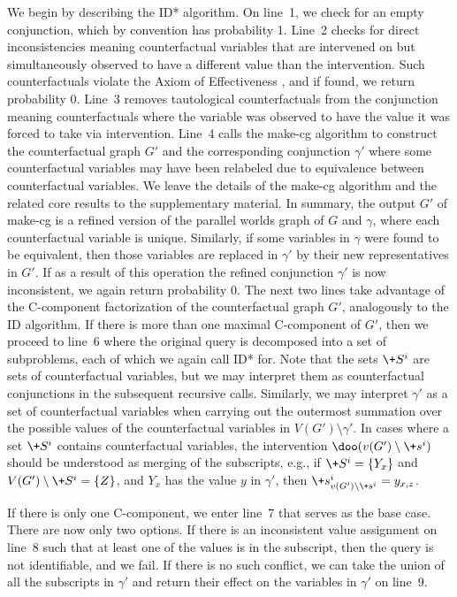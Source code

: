 We begin by describing the ID* algorithm. On line~1, we check for an empty conjunction, which by convention has probability 1. Line~2 checks for direct inconsistencies meaning counterfactual variables that are intervened on but simultaneously observed to have a different value than the intervention. Such counterfactuals violate the Axiom of Effectiveness \citep{pearl2009}, and if found, we return probability 0. Line~3 removes tautological counterfactuals from the conjunction meaning counterfactuals where the variable was observed to have the value it was forced to take via intervention. Line~4 calls the make-cg algorithm to construct the counterfactual graph \(G'\) and the corresponding conjunction \(\gamma'\) where some counterfactual variables may have been relabeled due to equivalence between counterfactual variables. We leave the details of the make-cg algorithm and the related core results to the supplementary material. In summary, the output \(G'\) of make-cg is a refined version of the parallel worlds graph of \(G\) and \(\gamma\), where each counterfactual variable is unique. Similarly, if some variables in \(\gamma\) were found to be equivalent, then those variables are replaced in \(\gamma'\) by their new representatives in \(G'\). If as a result of this operation the refined conjunction \(\gamma'\) is now inconsistent, we again return probability 0. The next two lines take advantage of the C-component factorization of the counterfactual graph \(G'\), analogously to the ID algorithm. If there is more than one maximal C-component of \(G'\), then we proceed to line~6 where the original query is decomposed into a set of subproblems, each of which we again call ID* for. Note that the sets \(\+ S^i\) are sets of counterfactual variables, but we may interpret them as counterfactual conjunctions in the subsequent recursive calls. Similarly, we may interpret \(\gamma'\) as a set of counterfactual variables when carrying out the outermost summation over the possible values of the counterfactual variables in \(V(G')\setminus \gamma'\). In cases where a set \(\+ S^i\) contains counterfactual variables, the intervention \(\doo(v(G') \setminus \+ s^i)\) should be understood as merging of the subscripts, e.g., if \(\+ S^i = \{Y_x\}\) and \(V(G') \setminus \+ S^i = \{Z\}\), and \(Y_x\) has the value \(y\) in \(\gamma'\), then \(\+ s^i_{v(G')\setminus \+ s^i} = y_{x,z}\).

If there is only one C-component, we enter line~7 that serves as the base case. There are now only two options. If there is an inconsistent value assignment on line~8 such that at least one of the values is in the subscript, then the query is not identifiable, and we fail. If there is no such conflict, we can take the union of all the subscripts in \(\gamma'\) and return their effect on the variables in \(\gamma'\) on line~9.

